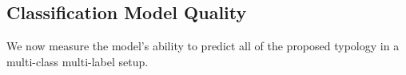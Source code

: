 






\subsection{Classification Model Quality}
\label{sec_prediction_quality}
We now measure the model's ability to predict all \taxtypes{} of the proposed typology in a multi-class multi-label setup.

